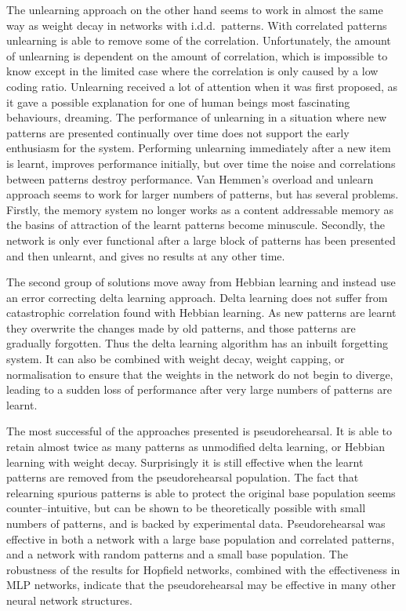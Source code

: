 The unlearning approach on the other hand seems to work in almost the same way as weight decay in networks with i.d.d.\ patterns.  With correlated patterns unlearning is able to remove some of the correlation.  Unfortunately, the amount of unlearning is dependent on the amount of correlation, which is impossible to know  except in the limited case where the correlation is only caused by a low coding ratio.  Unlearning received a lot of attention when it was first proposed, as it gave a possible explanation for one of human beings most fascinating behaviours, dreaming.  The performance of unlearning in a situation where new patterns are presented continually over time does not support the early enthusiasm for the system.  Performing  unlearning immediately after a new item is learnt, improves performance initially, but over time the noise and correlations between patterns destroy performance.  Van Hemmen's overload and unlearn approach seems to work for larger numbers of patterns, but has several problems.  Firstly, the memory system no longer works as a content addressable memory as the basins of attraction of the learnt patterns become minuscule.  Secondly, the network is only ever functional after a large block of patterns has been presented and then unlearnt, and gives no results at any other time.

The second group of solutions move away from Hebbian learning and instead use an error correcting delta learning approach.  Delta learning does not suffer from catastrophic correlation found with Hebbian learning.  As new patterns are learnt they overwrite the changes made by old patterns, and those patterns are gradually forgotten.  Thus the delta learning algorithm has an inbuilt forgetting system.  It can also be combined with weight decay, weight capping, or normalisation to ensure that the weights in the network do not begin to diverge, leading to a sudden loss of performance after very large numbers of patterns are learnt.


The most successful of the approaches presented is pseudorehearsal.  It is able to retain almost twice as many patterns as unmodified delta learning, or Hebbian learning with weight decay.  Surprisingly it is still effective when the learnt patterns are removed from the pseudorehearsal population.  The fact that relearning spurious patterns is able to protect the original base population seems counter--intuitive, but can be shown to be theoretically possible with small numbers of patterns, and is backed by experimental data.  Pseudorehearsal was effective in both a network with a large base population and correlated patterns, and a network with random patterns and a small base population.  The robustness of the results for Hopfield networks, combined with the effectiveness in MLP networks, indicate that the pseudorehearsal may be effective in many other neural network structures.

